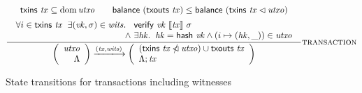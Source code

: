 \documentclass[11pt,a4paper]{article}
\DeclareMathOperator{\dom}{dom}
\newcommand{\restrictdom}{\lhd}
\newcommand{\subtractdom}{\mathbin{\slashed{\restrictdom}}}
\newcommand{\union}{\cup}
\newcommand{\var}[1]{\mathit{#1}}
\newcommand{\fun}[1]{\mathsf{#1}}
\newcommand{\verified}[3]{\fun{verify} ~ #1 ~ \llbracket #2 \rrbracket ~ #3}
\newcommand{\transitionarrow}[2]{\xlongrightarrow[\textsc{#1}]{#2}}
\begin{document}
\begin{figure}
\begin{equation*}
\frac{
  \begin{array}{c}
  \fun{txins} ~ \var{tx} \subseteq \dom \var{utxo} \qquad
  \fun{balance}~(\fun{txouts}~\var{tx}) \leq \fun{balance}~(\fun{txins} ~ \var{tx} \restrictdom \var{utxo})
  \\[0.5em]
    \begin{array}{r@{~}l}
      \forall i \in \fun{txins} ~ \var{tx} \;\;
      \exists (\var{vk}, \sigma) \in \var{wits}. \;\; &
      \verified{\var{vk}}{\var{tx}}{\sigma} \\
    \wedge &
      \exists \var{hk}. \;\; \var{hk} = \fun{hash}~ \var{vk}
    \wedge
      (i \mapsto (\var{hk}, \_)) \in \var{utxo}
    \end{array}
  \end{array}
}{
  \left(\begin{array}{r}
    \var{utxo} \\
    \Lambda
  \end{array}\right)
  \transitionarrow{}{(\var{tx}, \var{wits})}
  \left(\begin{array}{l}
    (\fun{txins} ~ \var{tx} \subtractdom \var{utxo}) \union \fun{txouts}~\var{tx} \\
    \Lambda ; \var{tx}
  \end{array}\right)
}
\textsc{transaction}
\end{equation*}
%
\caption{State transitions for transactions including witnesses}
\label{fig:transactions_witnesses}
\end{figure}




\end{document}
